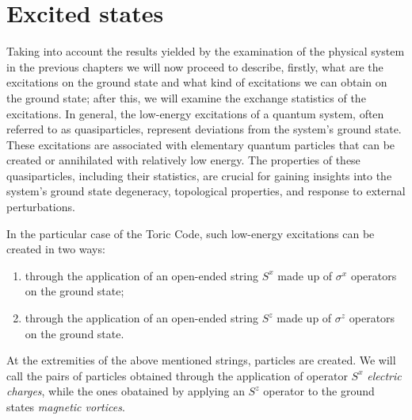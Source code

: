 


\newpage
\section{Excited states}
\label{sec:ES}


Taking into account the results yielded by the examination of the physical system in the previous chapters we will now proceed to describe, firstly, what are the excitations on the ground state and what kind of excitations we can obtain on the ground state; after this, we will examine the exchange statistics of the excitations.\newline
In general, the low-energy excitations of a quantum system, often referred to as quasiparticles, represent deviations from the system's ground state. These excitations are associated with elementary quantum particles that can be created or annihilated with relatively low energy. The properties of these quasiparticles, including their statistics, are crucial for gaining insights into the system's ground state degeneracy, topological properties, and response to external perturbations. \newline

In the particular case of the Toric Code, such low-energy excitations can be created in two ways: 

\begin{enumerate}
	\item through the application of an open-ended string $S^x$ made up of $\sigma^x$ operators on the ground state;
	
	\item through the application of an open-ended string $S^z$ made up of $\sigma^z$ operators on the ground state.
\end{enumerate}

At the extremities of the above mentioned strings, particles are created. We will call the pairs of particles obtained through the application of operator $S^x$ \textit{electric charges}, while the ones obatained by applying an $S^z$ operator to the ground states \textit{magnetic vortices}.\newline


